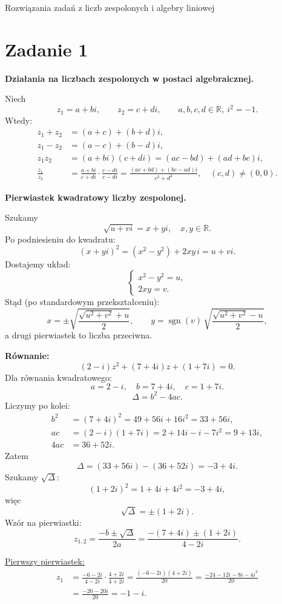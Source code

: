 \documentclass[12pt,a4paper]{article}
\begin{document}
\begin{center}
{\LARGE Rozwiązania zadań z liczb zespolonych i algebry liniowej}
\end{center}

\section*{Zadanie 1}
\textbf{Działania na liczbach zespolonych w postaci algebraicznej.}

Niech
\[
z_1=a+bi,\qquad z_2=c+di,\qquad a,b,c,d\in\mathbb{R},\ i^2=-1.
\]
Wtedy:
\begin{align*}
z_1+z_2&=(a+c)+(b+d)i,\\
z_1-z_2&=(a-c)+(b-d)i,\\
z_1z_2&=(a+bi)(c+di)=(ac-bd)+(ad+bc)i,\\
\frac{z_1}{z_2}&=\frac{a+bi}{c+di}\cdot\frac{c-di}{c-di}
=\frac{(ac+bd)+(bc-ad)i}{c^2+d^2},\quad (c,d)\neq(0,0).
\end{align*}

\textbf{Pierwiastek kwadratowy liczby zespolonej.}

Szukamy
\[
\sqrt{u+vi}=x+yi,\quad x,y\in\mathbb{R}.
\]
Po podniesieniu do kwadratu:
\[
(x+yi)^2=(x^2-y^2)+2xy\,i=u+vi.
\]
Dostajemy układ:
\[
\begin{cases}
x^2-y^2=u,\\
2xy=v.
\end{cases}
\]
Stąd (po standardowym przekształceniu):
\[
x=\pm\sqrt{\frac{\sqrt{u^2+v^2}+u}{2}},
\qquad
y=\operatorname{sgn}(v)\,\sqrt{\frac{\sqrt{u^2+v^2}-u}{2}},
\]
a drugi pierwiastek to liczba przeciwna.

\bigskip
\textbf{Równanie:}
\[
(2-i)z^2+(7+4i)z+(1+7i)=0.
\]
Dla równania kwadratowego:
\[
a=2-i,\quad b=7+4i,\quad c=1+7i.
\]
\[
\Delta=b^2-4ac.
\]
Liczymy po kolei:
\begin{align*}
b^2&=(7+4i)^2=49+56i+16i^2=33+56i,\\
ac&=(2-i)(1+7i)=2+14i-i-7i^2=9+13i,\\
4ac&=36+52i.
\end{align*}
Zatem
\[
\Delta=(33+56i)-(36+52i)=-3+4i.
\]
Szukamy $\sqrt{\Delta}$:
\[
(1+2i)^2=1+4i+4i^2=-3+4i,
\]
więc
\[
\sqrt{\Delta}=\pm(1+2i).
\]
Wzór na pierwiastki:
\[
z_{1,2}=\frac{-b\pm\sqrt{\Delta}}{2a}=\frac{-(7+4i)\pm(1+2i)}{4-2i}.
\]

\underline{Pierwszy pierwiastek:}
\begin{align*}
z_1&=\frac{-6-2i}{4-2i}\cdot\frac{4+2i}{4+2i}
=\frac{(-6-2i)(4+2i)}{20}
=\frac{-24-12i-8i-4i^2}{20}\\
&=\frac{-20-20i}{20}=-1-i.
\end{align*}
\end{document}
